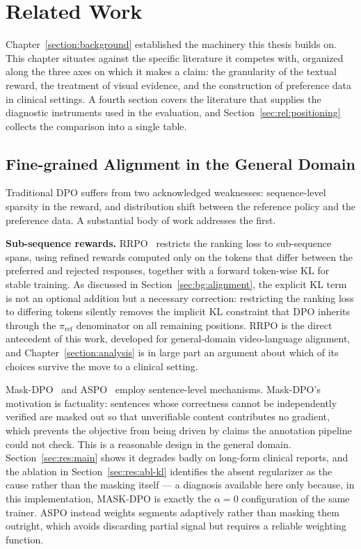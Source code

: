 \section{Related Work}
\label{section:related}

Chapter~\ref{section:background} established the machinery this thesis builds on. This chapter situates \ourloss{} against the specific literature it competes with, organized along the three axes on which it makes a claim: the granularity of the textual reward, the treatment of visual evidence, and the construction of preference data in clinical settings. A fourth section covers the literature that supplies the diagnostic instruments used in the evaluation, and Section~\ref{sec:rel:positioning} collects the comparison into a single table.

\subsection{Fine-grained Alignment in the General Domain}
\label{sec:rel:general}

Traditional DPO suffers from two acknowledged weaknesses: sequence-level sparsity in the reward, and distribution shift between the reference policy and the preference data. A substantial body of work addresses the first.

\textbf{Sub-sequence rewards.} RRPO~\cite{sarkar2025self} restricts the ranking loss to sub-sequence spans, using refined rewards computed only on the tokens that differ between the preferred and rejected responses, together with a forward token-wise KL for stable training. As discussed in Section~\ref{sec:bg:alignment}, the explicit KL term is not an optional addition but a necessary correction: restricting the ranking loss to differing tokens silently removes the implicit KL constraint that DPO inherits through the $\pi_{\text{ref}}$ denominator on all remaining positions. RRPO is the direct antecedent of this work, developed for general-domain video-language alignment, and Chapter~\ref{section:analysis} is in large part an argument about which of its choices survive the move to a clinical setting.

Mask-DPO~\cite{gu2025mask} and ASPO~\cite{wang2025aspo} employ sentence-level mechanisms. Mask-DPO's motivation is factuality: sentences whose correctness cannot be independently verified are masked out so that unverifiable content contributes no gradient, which prevents the objective from being driven by claims the annotation pipeline could not check. This is a reasonable design in the general domain. Section~\ref{sec:res:main} shows it degrades badly on long-form clinical reports, and the ablation in Section~\ref{sec:res:abl-kl} identifies the absent regularizer as the cause rather than the masking itself --- a diagnosis available here only because, in this implementation, MASK-DPO is exactly the $\alpha = 0$ configuration of the same trainer. ASPO instead weights segments adaptively rather than masking them outright, which avoids discarding partial signal but requires a reliable weighting function.

